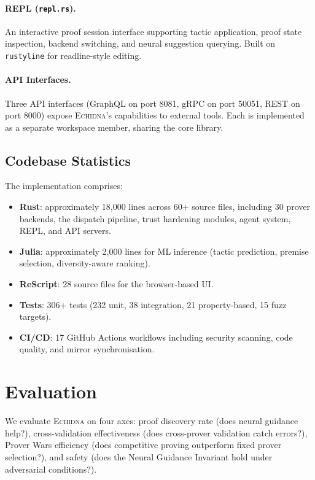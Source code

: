 \documentclass[11pt,a4paper]{article}
\newcommand{\echidna}{\textsc{Echidna}}
\begin{document}
\paragraph{REPL (\texttt{repl.rs}).}
An interactive proof session interface supporting tactic application,
proof state inspection, backend switching, and neural suggestion querying.
Built on \texttt{rustyline} for readline-style editing.

\paragraph{API Interfaces.}
Three API interfaces (GraphQL on port 8081, gRPC on port 50051, REST on port
8000) expose \echidna{}'s capabilities to external tools. Each is implemented
as a separate workspace member, sharing the core library.

\subsection{Codebase Statistics}

The implementation comprises:
\begin{itemize}
  \item \textbf{Rust}: approximately 18,000 lines across 60+ source files,
  including 30 prover backends, the dispatch pipeline, trust hardening modules,
  agent system, REPL, and API servers.
  \item \textbf{Julia}: approximately 2,000 lines for ML inference (tactic
  prediction, premise selection, diversity-aware ranking).
  \item \textbf{ReScript}: 28 source files for the browser-based UI.
  \item \textbf{Tests}: 306+ tests (232 unit, 38 integration, 21
  property-based, 15 fuzz targets).
  \item \textbf{CI/CD}: 17 GitHub Actions workflows including security
  scanning, code quality, and mirror synchronisation.
\end{itemize}


\section{Evaluation}
\label{sec:evaluation}

We evaluate \echidna{} on four axes: proof discovery rate (does neural guidance
help?), cross-validation effectiveness (does cross-prover validation catch
errors?), Prover Wars efficiency (does competitive proving outperform fixed
prover selection?), and safety (does the Neural Guidance Invariant hold under
adversarial conditions?).
\end{document}
